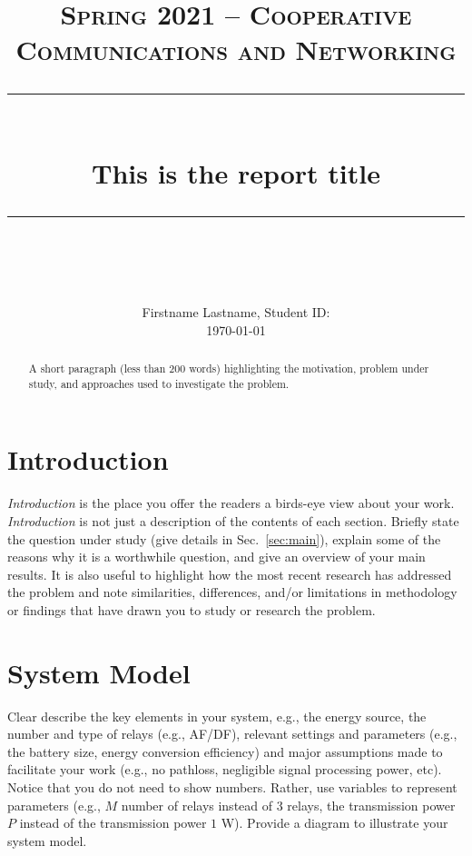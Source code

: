 \documentclass[11pt,a4paper]{scrartcl}
\newcommand{\horrule}[1]{\rule{\linewidth}{#1}}     %
\begin{document}
\title{
        \normalfont \normalsize \textsc{Spring 2021 -- Cooperative Communications and Networking} \\ [25pt]
        \horrule{0.5pt} \\[0.4cm]
        \huge This is the report title \\
        \horrule{2pt} \\[0.5cm]
}

\author{
        \normalfont                                 \normalsize
        Firstname Lastname, Student ID: \\[-3pt]      \normalsize
        \today
}


\date{} %
\maketitle

\begin{abstract}
A short paragraph (less than 200 words) highlighting the motivation, problem under study, and approaches used to investigate the problem.
\end{abstract}

\section{Introduction}
\emph{Introduction} is the place you offer the readers a birds-eye view about your work. \emph{Introduction} is not just a description of the contents of each section. Briefly state the question under study (give details in Sec.~\ref{sec:main}), explain some of the reasons why it is a worthwhile question, and give an overview of your main results. It is also useful to highlight how the most recent research has addressed the problem and note similarities,
differences, and/or limitations in methodology or findings that have drawn you to study or research the problem.

\section{System Model}\label{sec:model}
Clear describe the key elements in your system, e.g., the energy source, the number and type of relays (e.g., AF/DF), relevant settings and parameters (e.g., the battery size, energy conversion efficiency) and major assumptions made to facilitate your work (e.g., no pathloss, negligible signal processing power, etc). Notice that you do not need to show numbers. Rather, use variables to represent parameters (e.g., $M$ number of relays instead of 3
relays, the transmission power $P$ instead of the transmission power $1$ W). Provide a diagram to illustrate your system model.
\end{document}
